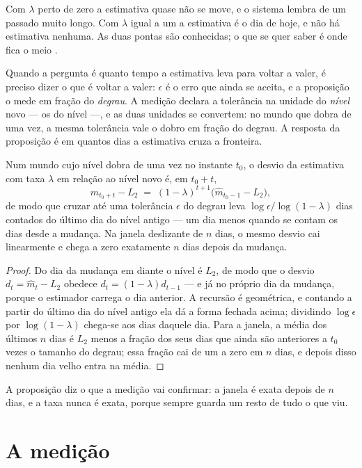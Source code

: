 Com $\lambda$ perto de zero a estimativa quase não se move, e o sistema lembra de um passado muito
longo. Com $\lambda$ igual a um a estimativa é o dia de hoje, e não há estimativa nenhuma. As duas
pontas são conhecidas; o que se quer saber é onde fica o meio \cite{dahlhaus1998optimal}.

Quando a pergunta é quanto tempo a estimativa leva para voltar a valer, é preciso dizer o que é
voltar a valer: $\epsilon$ é o erro que ainda se aceita, e a proposição o mede em fração do
\emph{degrau}. A medição declara a tolerância na unidade do \emph{nível} novo --- os
\numEsquecimentoTolerancia{} do nível ---, e as duas unidades se convertem: no mundo que dobra de
uma vez, a mesma tolerância vale o dobro em fração do degrau. A resposta da proposição é em quantos
dias a estimativa cruza a fronteira.
\begin{proposicao}\label{prop:meia-vida}
Num mundo cujo nível dobra de uma vez no instante $t_0$, o desvio da estimativa com taxa $\lambda$
em relação ao nível novo é, em $t_0 + t$,
\[
\hat m_{t_0+t} - L_2 \;=\; (1-\lambda)^{t+1}\big(\hat m_{t_0-1} - L_2\big),
\]
de modo que cruzar até uma tolerância $\epsilon$ do degrau leva
$\log \epsilon / \log(1-\lambda)$ dias contados do último dia do nível antigo --- um dia menos
quando se contam os dias desde a mudança. Na janela deslizante de $n$ dias, o mesmo desvio cai
linearmente e chega a zero exatamente $n$ dias depois da mudança.
\end{proposicao}

\begin{proof}
Do dia da mudança em diante o nível é $L_2$, de modo que o desvio $d_t = \hat m_t - L_2$ obedece
$d_t = (1-\lambda) d_{t-1}$ --- e já no próprio dia da mudança, porque o estimador carrega o dia
anterior. A recursão é geométrica, e contando a partir do último dia do nível antigo ela dá a forma
fechada acima; dividindo $\log\epsilon$ por $\log(1-\lambda)$ chega-se aos dias daquele dia. Para a janela, a média dos últimos $n$ dias
é $L_2$ menos a fração dos seus dias que ainda são anteriores a $t_0$ vezes o tamanho do degrau; essa
fração cai de um a zero em $n$ dias, e depois disso nenhum dia velho entra na média.
\end{proof}

A proposição diz o que a medição vai confirmar: a janela é exata depois de $n$ dias, e a taxa nunca
é exata, porque sempre guarda um resto de tudo o que viu.

\section{A medição}

